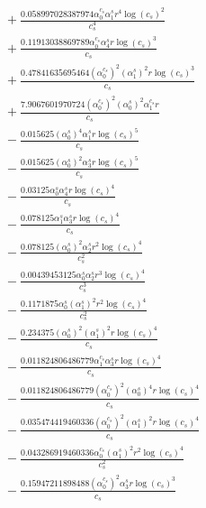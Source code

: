 \documentclass[10pt]{article}
\begin{document}
\begin{align*}
&{}  + \frac{0.058997028387974 \alpha_{0}^{c_s} \alpha_{1}^s r^{4} \log{\left(c_{s} \right)}^{2}}{c_{s}^{4}} \\
&{}  + \frac{0.11913038869789 \alpha_{0}^{c_s} \alpha_{4}^s r \log{\left(c_{s} \right)}^{3}}{c_{s}} \\
&{}  + \frac{0.47841635695464 \left(\alpha_{0}^{c_s}\right)^{2} \left(\alpha_{1}^s\right)^{2} r \log{\left(c_{s} \right)}^{3}}{c_{s}} \\
&{}  + \frac{7.9067601970724 \left(\alpha_{0}^{c_s}\right)^{2} \left(\alpha_{0}^s\right)^{2} \alpha_{1}^{c_s} r}{c_{s}} \\
&{}  - \frac{0.015625 \left(\alpha_{0}^s\right)^{4} \alpha_{1}^s r \log{\left(c_{s} \right)}^{5}}{c_{s}} \\
&{}  - \frac{0.015625 \left(\alpha_{0}^s\right)^{2} \alpha_{3}^s r \log{\left(c_{s} \right)}^{5}}{c_{s}} \\
&{}  - \frac{0.03125 \alpha_{0}^s \alpha_{4}^s r \log{\left(c_{s} \right)}^{4}}{c_{s}} \\
&{}  - \frac{0.078125 \alpha_{1}^s \alpha_{3}^s r \log{\left(c_{s} \right)}^{4}}{c_{s}} \\
&{}  - \frac{0.078125 \left(\alpha_{0}^s\right)^{2} \alpha_{2}^s r^{2} \log{\left(c_{s} \right)}^{4}}{c_{s}^{2}} \\
&{}  - \frac{0.00439453125 \alpha_{0}^s \alpha_{2}^s r^{3} \log{\left(c_{s} \right)}^{4}}{c_{s}^{3}} \\
&{}  - \frac{0.1171875 \alpha_{0}^s \left(\alpha_{1}^s\right)^{2} r^{2} \log{\left(c_{s} \right)}^{4}}{c_{s}^{2}} \\
&{}  - \frac{0.234375 \left(\alpha_{0}^s\right)^{2} \left(\alpha_{1}^s\right)^{2} r \log{\left(c_{s} \right)}^{4}}{c_{s}} \\
&{}  - \frac{0.011824806486779 \alpha_{1}^{c_s} \alpha_{3}^s r \log{\left(c_{s} \right)}^{4}}{c_{s}} \\
&{}  - \frac{0.011824806486779 \left(\alpha_{0}^{c_s}\right)^{2} \left(\alpha_{0}^s\right)^{4} r \log{\left(c_{s} \right)}^{4}}{c_{s}} \\
&{}  - \frac{0.035474419460336 \left(\alpha_{0}^{c_s}\right)^{2} \left(\alpha_{1}^s\right)^{2} r \log{\left(c_{s} \right)}^{4}}{c_{s}} \\
&{}  - \frac{0.043286919460336 \alpha_{0}^{c_s} \left(\alpha_{1}^s\right)^{2} r^{2} \log{\left(c_{s} \right)}^{4}}{c_{s}^{2}} \\
&{}  - \frac{0.15947211898488 \left(\alpha_{0}^{c_s}\right)^{2} \alpha_{3}^s r \log{\left(c_{s} \right)}^{3}}{c_{s}} \\

\end{align*}
\end{document}
